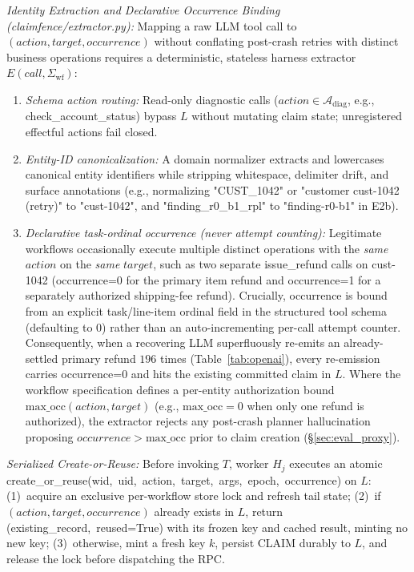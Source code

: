 \documentclass[10pt,journal]{IEEEtran}
\def\texttt#1{#1}%
\theoremstyle{definition}
\theoremstyle{remark}
\begin{document}
\emph{Identity Extraction and Declarative Occurrence Binding (\texttt{claimfence/\allowbreak extractor.py}):} Mapping a raw LLM tool call to $(\mathit{action}, \mathit{target}, \mathit{occurrence})$ without conflating post-crash retries with distinct business operations requires a deterministic, stateless harness extractor $E(\mathit{call}, \Sigma_{\mathrm{wf}})$:
\begin{enumerate}
  \item \emph{Schema action routing:} Read-only diagnostic calls ($\mathit{action} \in \mathcal{A}_{\mathrm{diag}}$, e.g., \texttt{check\_account\_status}) bypass $L$ without mutating claim state; unregistered effectful actions fail closed.
  \item \emph{Entity-ID canonicalization:} A domain normalizer extracts and lowercases canonical entity identifiers while stripping whitespace, delimiter drift, and surface annotations (e.g., normalizing \texttt{"CUST\_1042"} or \texttt{"customer cust-1042 (retry)"} to \texttt{"cust-1042"}, and \texttt{"finding\_r0\_b1\_rpl"} to \texttt{"finding-r0-b1"} in E2b).
  \item \emph{Declarative task-ordinal \texttt{occurrence} (never attempt counting):} Legitimate workflows occasionally execute multiple distinct operations with the \emph{same} $\mathit{action}$ on the \emph{same} $\mathit{target}$, such as two separate \texttt{issue\_refund} calls on \texttt{cust-1042} (\texttt{occurrence=0} for the primary item refund and \texttt{occurrence=1} for a separately authorized shipping-fee refund). Crucially, \texttt{occurrence} is bound from an explicit task/line-item ordinal field in the structured tool schema (defaulting to $0$) rather than an auto-incrementing per-call attempt counter. Consequently, when a recovering LLM superfluously re-emits an already-settled primary refund $196$ times (Table~\ref{tab:openai}), every re-emission carries \texttt{occurrence=0} and hits the existing committed claim in $L$. Where the workflow specification defines a per-entity authorization bound $\text{max\_occ}(\mathit{action}, \mathit{target})$ (e.g., $\text{max\_occ}=0$ when only one refund is authorized), the extractor rejects any post-crash planner hallucination proposing $\texttt{occurrence} > \text{max\_occ}$ prior to claim creation (\S\ref{sec:eval_proxy}).
\end{enumerate}

\emph{Serialized Create-or-Reuse:} Before invoking $T$, worker $H_j$ executes an atomic \texttt{create\_or\_reuse(\allowbreak wid,\allowbreak\ uid,\allowbreak\ action,\allowbreak\ target,\allowbreak\ args,\allowbreak\ epoch,\allowbreak\ occurrence)} on $L$: (1)~acquire an exclusive per-workflow store lock and refresh tail state; (2)~if $(\mathit{action}, \mathit{target}, \mathit{occurrence})$ already exists in $L$, return \texttt{(existing\_record,\allowbreak\ reused=True)} with its frozen \texttt{key} and cached \texttt{result}, minting no new key; (3)~otherwise, mint a fresh key $k$, persist \texttt{CLAIM} durably to $L$, and release the lock before dispatching the RPC.
\end{document}
